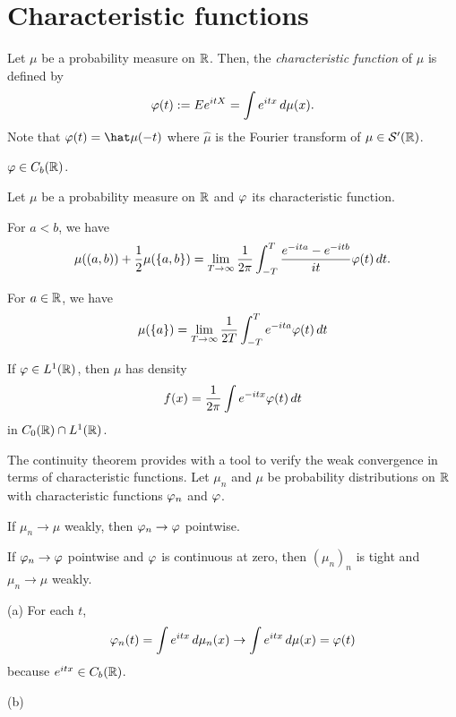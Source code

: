 \documentclass{../../large}
\begin{document}
\section{Characteristic functions}

\begin{prb}
Let $\mu$ be a probability measure on $\mathbb{R}$.
Then, the \emph{characteristic function} of $\mu$ is defined by
\[\varphi(t):=Ee^{itX}=\int e^{itx}\,d\mu(x).\]
Note that $\f(t)=\hat\mu(-t)$ where $\hat\mu$ is the Fourier transform of $\mu\in\mathcal{S}'(\mathbb{R})$.
\begin{parts}
\item $\varphi\in C_b(\mathbb{R})$.
\end{parts}
\end{prb}

\begin{prb}
Let $\mu$ be a probability measure on $\mathbb{R}$ and $\varphi$ its characteristic function.
\begin{parts}
\item For $a<b$, we have
\[\mu((a,b))+\frac12\mu(\{a,b\})=\lim_{T\to\infty}\frac1{2\pi}\int_{-T}^T\frac{e^{-ita}-e^{-itb}}{it}\varphi(t)\,dt.\]
\item For $a\in\mathbb{R}$, we have
\[\mu(\{a\})=\lim_{T\to\infty}\frac1{2T}\int_{-T}^Te^{-ita}\varphi(t)\,dt\]
\item If $\varphi\in L^1(\mathbb{R})$, then $\mu$ has density
\[f(x)=\frac1{2\pi}\int e^{-itx}\varphi(t)\,dt\]
in $C_0(\mathbb{R})\cap L^1(\mathbb{R})$.
\end{parts}
\end{prb}

\begin{prb}
The continuity theorem provides with a tool to verify the weak convergence in terms of characteristic functions.
Let $\mu_n$ and $\mu$ be probability distributions on $\mathbb{R}$ with characteristic functions $\varphi_n$ and $\varphi$.
\begin{parts}
\item If $\mu_n\to\mu$ weakly, then $\varphi_n\to\varphi$ pointwise.
\item If $\varphi_n\to\varphi$ pointwise and $\varphi$ is continuous at zero, then $(\mu_n)_n$ is tight and $\mu_n\to\mu$ weakly.
\end{parts}
\end{prb}
\begin{pf}
(a)
For each $t$,
\[\varphi_n(t)=\int e^{itx}\,d\mu_n(x)\to\int e^{itx}\,d\mu(x)=\varphi(t)\]
because $e^{itx}\in C_b(\mathbb{R})$.

(b)


\end{pf}
\end{document}
